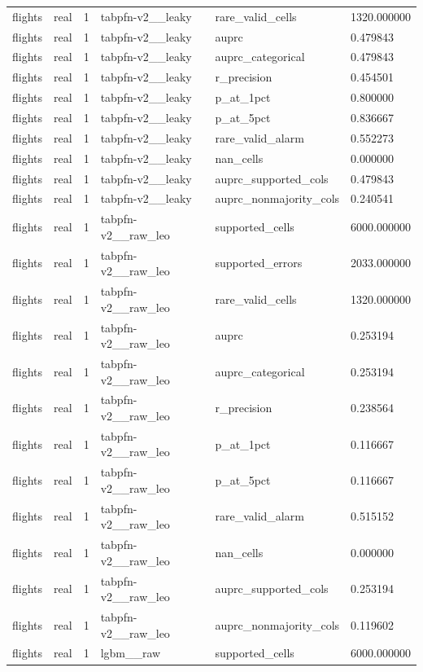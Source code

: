 \begin{tabular}{llllll}
flights & real & 1 & tabpfn-v2\_\_leaky & rare\_valid\_cells & 1320.000000 \\
flights & real & 1 & tabpfn-v2\_\_leaky & auprc & 0.479843 \\
flights & real & 1 & tabpfn-v2\_\_leaky & auprc\_categorical & 0.479843 \\
flights & real & 1 & tabpfn-v2\_\_leaky & r\_precision & 0.454501 \\
flights & real & 1 & tabpfn-v2\_\_leaky & p\_at\_1pct & 0.800000 \\
flights & real & 1 & tabpfn-v2\_\_leaky & p\_at\_5pct & 0.836667 \\
flights & real & 1 & tabpfn-v2\_\_leaky & rare\_valid\_alarm & 0.552273 \\
flights & real & 1 & tabpfn-v2\_\_leaky & nan\_cells & 0.000000 \\
flights & real & 1 & tabpfn-v2\_\_leaky & auprc\_supported\_cols & 0.479843 \\
flights & real & 1 & tabpfn-v2\_\_leaky & auprc\_nonmajority\_cols & 0.240541 \\
flights & real & 1 & tabpfn-v2\_\_raw\_leo & supported\_cells & 6000.000000 \\
flights & real & 1 & tabpfn-v2\_\_raw\_leo & supported\_errors & 2033.000000 \\
flights & real & 1 & tabpfn-v2\_\_raw\_leo & rare\_valid\_cells & 1320.000000 \\
flights & real & 1 & tabpfn-v2\_\_raw\_leo & auprc & 0.253194 \\
flights & real & 1 & tabpfn-v2\_\_raw\_leo & auprc\_categorical & 0.253194 \\
flights & real & 1 & tabpfn-v2\_\_raw\_leo & r\_precision & 0.238564 \\
flights & real & 1 & tabpfn-v2\_\_raw\_leo & p\_at\_1pct & 0.116667 \\
flights & real & 1 & tabpfn-v2\_\_raw\_leo & p\_at\_5pct & 0.116667 \\
flights & real & 1 & tabpfn-v2\_\_raw\_leo & rare\_valid\_alarm & 0.515152 \\
flights & real & 1 & tabpfn-v2\_\_raw\_leo & nan\_cells & 0.000000 \\
flights & real & 1 & tabpfn-v2\_\_raw\_leo & auprc\_supported\_cols & 0.253194 \\
flights & real & 1 & tabpfn-v2\_\_raw\_leo & auprc\_nonmajority\_cols & 0.119602 \\
flights & real & 1 & lgbm\_\_raw & supported\_cells & 6000.000000 \\

\end{tabular}
